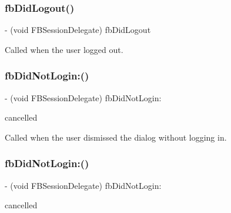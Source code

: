 \subsubsection{\texorpdfstring{fb\+Did\+Logout()}{fbDidLogout()}\hspace{0.1cm}{\footnotesize\ttfamily [2/2]}}
{\footnotesize\ttfamily -\/ (void F\+B\+Session\+Delegate) fb\+Did\+Logout \begin{DoxyParamCaption}{ }\end{DoxyParamCaption}}

Called when the user logged out. \mbox{\label{protocolFBSessionDelegate_01-p_a9a99db70fc8bf01d00bfe78525c343ac}} 
\subsubsection{\texorpdfstring{fb\+Did\+Not\+Login\+:()}{fbDidNotLogin:()}\hspace{0.1cm}{\footnotesize\ttfamily [1/2]}}
{\footnotesize\ttfamily -\/ (void F\+B\+Session\+Delegate) fb\+Did\+Not\+Login\+: \begin{DoxyParamCaption}\item[{(B\+O\+OL)}]{cancelled }\end{DoxyParamCaption}}

Called when the user dismissed the dialog without logging in. \mbox{\label{protocolFBSessionDelegate_01-p_a9a99db70fc8bf01d00bfe78525c343ac}} 
\subsubsection{\texorpdfstring{fb\+Did\+Not\+Login\+:()}{fbDidNotLogin:()}\hspace{0.1cm}{\footnotesize\ttfamily [2/2]}}
{\footnotesize\ttfamily -\/ (void F\+B\+Session\+Delegate) fb\+Did\+Not\+Login\+: \begin{DoxyParamCaption}\item[{(B\+O\+OL)}]{cancelled }\end{DoxyParamCaption}}

